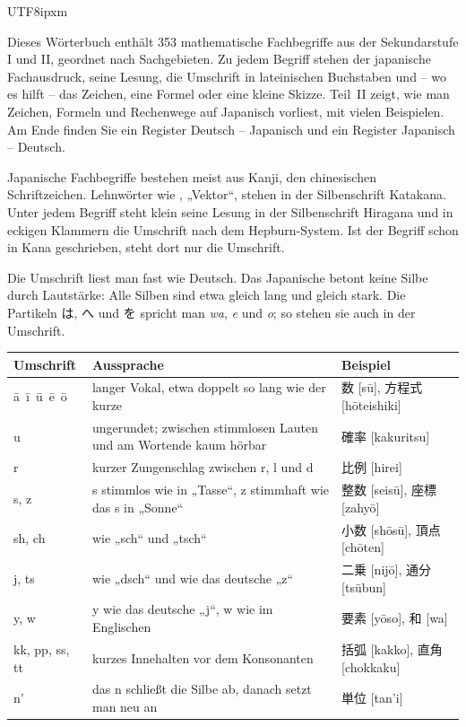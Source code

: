 \begin{CJK}{UTF8}{ipxm}\CJKabsatzschutz

\maketitle

Dieses Wörterbuch enthält 353 mathematische Fachbegriffe aus der Sekundarstufe I und II,
geordnet nach Sachgebieten. Zu jedem Begriff stehen der japanische Fachausdruck, seine Lesung, die
Umschrift in lateinischen Buchstaben und -- wo es hilft -- das Zeichen, eine Formel oder eine kleine
Skizze. Teil~II zeigt, wie man Zeichen, Formeln und Rechenwege auf Japanisch vorliest, mit vielen
Beispielen. Am Ende finden Sie ein Register Deutsch -- Japanisch und ein Register Japanisch -- Deutsch.


Japanische Fachbegriffe bestehen meist aus Kanji, den chinesischen Schriftzeichen. Lehnwörter wie
, „Vektor“, stehen in der Silbenschrift Katakana. Unter jedem Begriff steht klein
seine Lesung in der Silbenschrift Hiragana und in eckigen Klammern die Umschrift nach dem
Hepburn-System. Ist der Begriff schon in Kana geschrieben, steht dort nur die Umschrift.

Die Umschrift liest man fast wie Deutsch. Das Japanische betont keine Silbe durch Lautstärke: Alle
Silben sind etwa gleich lang und gleich stark. Die Partikeln は, へ und を spricht man \textit{wa},
\textit{e} und \textit{o}; so stehen sie auch in der Umschrift.

\medskip
{\small
\begin{tabular}{@{}>{\raggedright\arraybackslash}p{2.4cm} >{\raggedright\arraybackslash}p{9.2cm} >{\raggedright\arraybackslash}p{5.0cm}@{}}
	\toprule
	\textbf{Umschrift} & \textbf{Aussprache} & \textbf{Beispiel} \\ \midrule
	ā \,ī \,ū \,ē \,ō & langer Vokal, etwa doppelt so lang wie der kurze & \leavevmode 数 [sū], 方程式 [hōteishiki] \\
	u & ungerundet; zwischen stimmlosen Lauten und am Wortende kaum hörbar & \leavevmode 確率 [kakuritsu] \\
	r & kurzer Zungenschlag zwischen r, l und d & \leavevmode 比例 [hirei] \\
	s, z & s stimmlos wie in „Tasse“, z stimmhaft wie das s in „Sonne“ & \leavevmode 整数 [seisū], 座標 [zahyō] \\
	sh, ch & wie „sch“ und „tsch“ & \leavevmode 小数 [shōsū], 頂点 [chōten] \\
	j, ts & wie „dsch“ und wie das deutsche „z“ & \leavevmode 二乗 [nijō], 通分 [tsūbun] \\
	y, w & y wie das deutsche „j“, w wie im Englischen & \leavevmode 要素 [yōso], 和 [wa] \\
	kk, pp, ss, tt & kurzes Innehalten vor dem Konsonanten & \leavevmode 括弧 [kakko], 直角 [chokkaku] \\
	n' & das n schließt die Silbe ab, danach setzt man neu an & \leavevmode 単位 [tan'i] \\
	\bottomrule
\end{tabular}}


\end{CJK}
